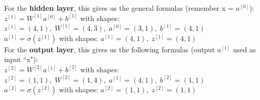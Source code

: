 \documentclass[11pt, a4paper]{article}
\begin{document}
\begin{spacing}{1.1}
	\noindent For the \textbf{hidden layer}, this gives us the general formulas (remember x = $a^{[0]}$): \vspace*{1mm} \\
	\hspace*{3mm} $z^{[1]} = W^{[1]}a^{[0]} + b^{[1]}$ with shapes: $z^{[1]}=(4,1),\; W^{[1]}=(4,3),\; a^{[0]}=(3,1),\; b^{[1]}=(4,1)$ \vspace*{1mm} \\
	\hspace*{3mm} $a^{[1]} = \sigma(z^{[1]})$ with shapes: $a^{[1]}=(4,1),\; z^{[1]}=(4,1)$ \vspace*{2mm} \\
	For the \textbf{output layer}, this gives us the following formulas (output $a^{[1]}$ used as input ``x"): \vspace*{1mm} \\
	\hspace*{3mm} $z^{[2]} = W^{[2]}a^{[1]} + b^{[2]}$ with shapes: $z^{[2]}=(1,1),\; W^{[2]}=(1,4),\; a^{[1]}=(4,1),\; b^{[2]}=(1,1)$ \vspace*{1mm} \\
	\hspace*{3mm} $a^{[2]} = \sigma(z^{[2]})$ with shapes: $a^{[2]}=(1,1),\; z^{[2]}=(1,1)$

\end{spacing}
\end{document}
